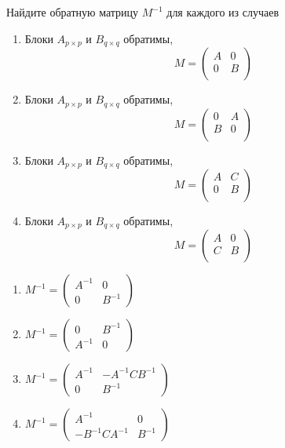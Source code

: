 \begin{problem}
Найдите обратную матрицу $M^{-1}$ для каждого из случаев
\begin{enumerate}
  \item Блоки $A_{p\times p}$ и $B_{q\times q}$ обратимы,
    \[
      M = \begin{pmatrix}
	A & 0 \\
	0 & B \\
      \end{pmatrix}
    \]
  \item Блоки $A_{p\times p}$ и $B_{q\times q}$ обратимы,
    \[
      M = \begin{pmatrix}
	0 & A \\
	B & 0 \\
      \end{pmatrix}
    \]

 \item Блоки $A_{p\times p}$ и $B_{q\times q}$ обратимы,
    \[
      M = \begin{pmatrix}
	A & C \\
	0 & B \\
      \end{pmatrix}
    \]
  \item Блоки $A_{p\times p}$ и $B_{q\times q}$ обратимы,
    \[
      M = \begin{pmatrix}
	A & 0 \\
	C & B \\
      \end{pmatrix}
    \]
\end{enumerate}
\begin{sol}
\begin{enumerate}
\item $M^{-1} = \begin{pmatrix}
A^{-1} & 0 \\
0 & B^{-1}
\end{pmatrix}$
\item $M^{-1} = \begin{pmatrix}
0 & B^{-1}  \\
A^{-1} & 0
\end{pmatrix}$
\item $M^{-1} = \begin{pmatrix}
A^{-1} & -A^{-1}CB^{-1}  \\
0 & B^{-1}
\end{pmatrix}$
\item $M^{-1} = \begin{pmatrix}
A^{-1} & 0  \\
-B^{-1}CA^{-1} & B^{-1}
\end{pmatrix}$
\end{enumerate}
\end{sol}
\end{problem}

